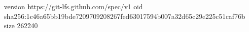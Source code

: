 version https://git-lfs.github.com/spec/v1
oid sha256:1c46a65bb19bde7209709208267fed63017594b007a32d65c29e225c51caf76b
size 262240

